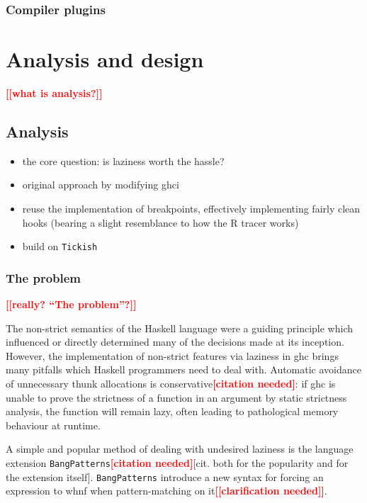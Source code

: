 \documentclass[thesis=B,english]{FITthesis}[2019/12/23]
\newcommand{\todo}[1]{\textcolor{red}{\textbf{[[#1]]}}}
\newcommand{\blind}[1][1]{\textcolor{gray}{\Blindtext[#1][1]}}
\newcommand{\citationNeeded}{\textcolor{red}{\textbf{[citation needed]}}}
\begin{document}
\subsection{Compiler plugins} \label{sec:compiler-plugins}
\blind[1]


\chapter{Analysis and design} \label{sec:analysis-design}
\todo{what is analysis?}
\blind[1]

\section{Analysis} \label{sec:analysis}
\begin{itemize}
	\item the core question: is laziness worth the hassle?
	\item original approach by modifying \acrshort{ghci}
	\item reuse the implementation of breakpoints, effectively implementing
		fairly clean hooks (bearing a slight resemblance to how the R tracer
		works)
	\item build on \texttt{Tickish}
\end{itemize}

\subsection{The problem} \label{sec:the-problem}
\todo{really? ``The problem''?}

The non-strict semantics of the Haskell language were a guiding principle which
influenced or directly determined many of the decisions made at its
inception\cite{history-of-haskell}. However, the implementation of non-strict
features via laziness in \acrshort{ghc} brings many pitfalls which Haskell
programmers need to deal with. Automatic avoidance of unnecessary thunk
allocations is conservative\citationNeeded: if \acrshort{ghc} is unable to
prove the strictness of a function in an argument by static strictness
analysis, the function will remain lazy, often leading to pathological memory
behaviour at runtime.

A simple and popular method of dealing with undesired laziness is the language
extension \texttt{BangPatterns}\citationNeeded [cit. both for the popularity
and for the extension itself]. \texttt{BangPatterns} introduce a new syntax for
forcing an expression to \acrshort{whnf} when pattern-matching on
it\todo{clarification needed}.
\end{document}
